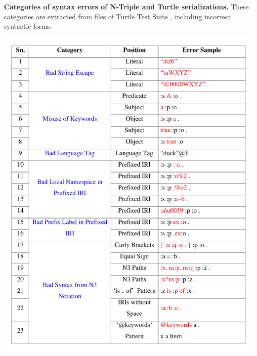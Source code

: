 \begin{appendices}
 

 \begin{table}[H]
 	\caption{\textbf{Categories of syntax errors of N-Triple and Turtle serializations.} These categories are extracted from files of Turtle Test Suite \cite{TurtleTests:Online}, including   incorrect syntactic forms.}
 \label{tab:syntaxErrorCate}
 	\centering
\includegraphics[width=5.5in]{images/bigTable.pdf}
\end{table}


\end{appendices}
